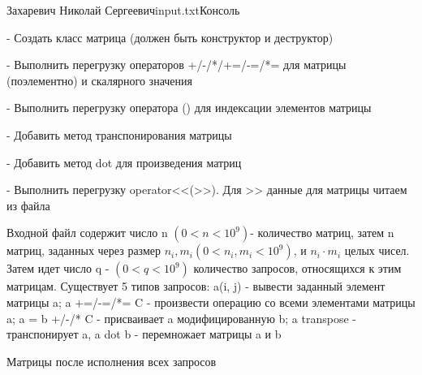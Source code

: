 \begin{problem}{1}{Захаревич Николай Сергеевич}{input.txt}{Консоль}

- Создать класс матрица (должен быть конструктор и деструктор)

- Выполнить перегрузку операторов +/-/*/+=/-=/*= для матрицы (поэлементно) и скалярного значения

- Выполнить перегрузку оператора () для индексации элементов матрицы

- Добавить метод транспонирования матрицы

- Добавить метод dot для произведения матриц

- Выполнить перегрузку operator<\!<(>\!>). Для >\!> данные для матрицы читаем из файла

\InputFile
Входной файл содержит число n \begin{math}(0 < n < 10^9)\end{math}- количество матриц, затем n матриц, заданных через размер
\begin{math}n_i, m_i (0 < n_i, m_i < 10^9) \end{math}, и \begin{math}n_i \cdot m_i \end{math} целых чисел. Затем идет число q - \begin{math}(0 < q < 10^9)\end{math}
количество запросов, относящихся к этим матрицам. Существует 5 типов запросов: a(i, j) - вывести заданный элемент матрицы a; a +=/-=/*= C - 
произвести операцию со всеми элементами матрицы a; a = b +/-/* C - присваивает a модифицированную b; a transpose - транспонирует a, a dot b - перемножает матрицы a и b

\OutputFile
Матрицы после исполнения всех запросов

\Example

\begin{example}
%
\end{example}

\Code


\end{problem}
